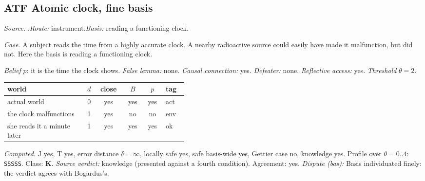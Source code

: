 \subsection*{ATF \enspace Atomic clock, fine basis}
\noindent\textit{Source.} \citet{Bogardus2014}.\quad \textit{Route:} instrument.\quad \textit{Basis:} reading a functioning clock.\par
\noindent\textit{Case.} A subject reads the time from a highly accurate clock. A nearby radioactive source could easily have made it malfunction, but did not. Here the basis is reading a functioning clock.\par
\noindent\textit{Belief} $p$: it is the time the clock shows.
 \textit{False lemma:} none. \textit{Causal connection:} yes. \textit{Defeater:} none. \textit{Reflective access:} yes. \textit{Threshold} $\theta = 2$.\par
\begin{center}\begin{tabular}{@{}p{0.43\linewidth}rcccl@{}}
world & $d$ & close & $B$ & $p$ & tag \\ \midrule
actual world & 0 & yes & yes & yes & act \\
the clock malfunctions & 1 & yes & no & no & env \\
she reads it a minute later & 1 & yes & yes & yes & ok \\
\end{tabular}\end{center}
\noindent\textit{Computed.} J yes, T yes, error distance $\delta = \infty$, locally safe yes, safe basis-wide yes, Gettier case no, knowledge yes. Profile over $\theta = 0..4$: \texttt{SSSSS}. Class: \textbf{K}.
 \textit{Source verdict:} knowledge (presented against a fourth condition). Agreement: yes.
 \textit{Dispute (bas):} Basis individuated finely: the verdict agrees with Bogardus's.
\par\medskip
{}
